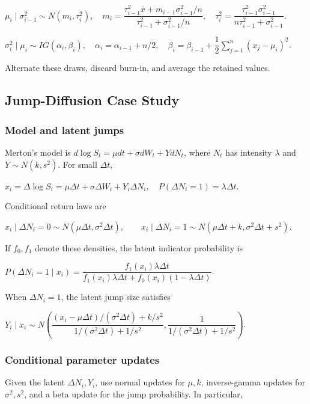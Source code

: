 $\mu_i\mid\sigma_{i-1}^2\sim N(m_i,\tau_i^2),\quad m_i=\dfrac{\tau_{i-1}^2\bar x+m_{i-1}\sigma_{i-1}^2/n}{\tau_{i-1}^2+\sigma_{i-1}^2/n},\quad \tau_i^2=\dfrac{\tau_{i-1}^2\sigma_{i-1}^2}{n\tau_{i-1}^2+\sigma_{i-1}^2}$.

$\sigma_i^2\mid\mu_i\sim IG(\alpha_i,\beta_i),\quad \alpha_i=\alpha_{i-1}+n/2,\quad \beta_i=\beta_{i-1}+\dfrac12\sum_{j=1}^n(x_j-\mu_i)^2$.

Alternate these draws, discard burn-in, and average the retained values.

\subsection{Jump-Diffusion Case Study}

\subsubsection*{Model and latent jumps}

Merton's model is $d\log S_t=\mu dt+\sigma dW_t+YdN_t$, where $N_t$ has intensity $\lambda$ and $Y\sim N(k,s^2)$. For small $\Delta t$,

$x_i=\Delta\log S_i=\mu\Delta t+\sigma\Delta W_i+Y_i\Delta N_i,\quad P(\Delta N_i=1)=\lambda\Delta t$.

Conditional return laws are

$x_i\mid\Delta N_i=0\sim N(\mu\Delta t,\sigma^2\Delta t),\qquad x_i\mid\Delta N_i=1\sim N(\mu\Delta t+k,\sigma^2\Delta t+s^2)$.

If $f_0,f_1$ denote these densities, the latent indicator probability is

$P(\Delta N_i=1\mid x_i)=\dfrac{f_1(x_i)\lambda\Delta t}{f_1(x_i)\lambda\Delta t+f_0(x_i)(1-\lambda\Delta t)}$.

When $\Delta N_i=1$, the latent jump size satisfies

$Y_i\mid x_i\sim N\left(\dfrac{(x_i-\mu\Delta t)/(\sigma^2\Delta t)+k/s^2}{1/(\sigma^2\Delta t)+1/s^2},\dfrac1{1/(\sigma^2\Delta t)+1/s^2}\right)$.

\subsubsection*{Conditional parameter updates}

Given the latent $\Delta N_i,Y_i$, use normal updates for $\mu,k$, inverse-gamma updates for $\sigma^2,s^2$, and a beta update for the jump probability. In particular,

